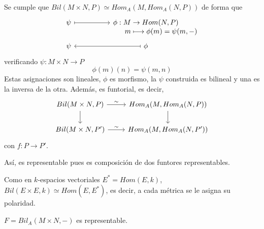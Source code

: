\begin{propi} Se cumple que $Bil(M \times N, P) \simeq Hom_A(M,Hom_A(N,P)) $
    de forma que    
    $$\bt \psi \arrow[mapsto]{r} &  \phi: M \rightarrow Hom(N,P)  \\[-8mm]  & \hspace{15mm} m \longmapsto \phi(m)=\psi(m,-) \\[-5mm] \psi & \arrow[mapsto]{l} \phi\et$$
    verificando $\psi: M \times N \longrightarrow P$
    $$\phi(m)(n) = \psi(m,n)$$
    Estas asignaciones son lineales, $\phi$ es morfismo, la $\psi$ construida es bilineal y una es la inversa de la otra.
    Adem\'as, es funtorial, es decir, 
$$\bt Bil(M \times N, P) \arrow{d}\arrow{r}{\sim} & Hom_A(M,Hom_A(N,P))\arrow{d} \\ Bil(M \times N, P') \arrow{r}{\sim} & Hom_A(M,Hom_A(N,P')) \et $$
con $f: P \longrightarrow P'$.  

As\'i, es representable pues es composici\'on de dos funtores representables. 
\end{propi}
\begin{obs}
    Como en $k$-espacios vectoriales $E^*=Hom(E,k)$, $Bil(E\times E, k) \simeq Hom(E,E^*)$, es decir, a cada m\'etrica se le asigna su polaridad.
\end{obs}
\begin{teo}
    $F = Bil_A(M\times N, -)$ es representable.
\end{teo}
